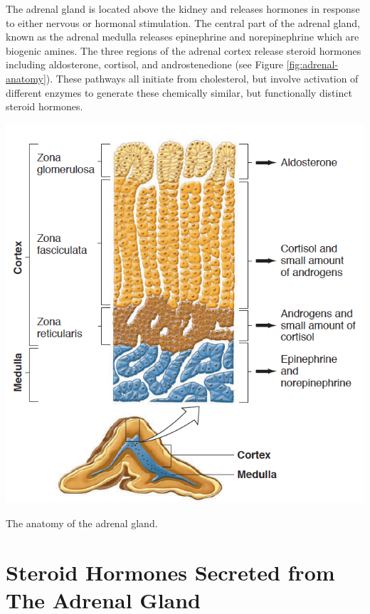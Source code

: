 \documentclass{tufte-handout}
\begin{document}
The adrenal gland is located above the kidney and releases hormones in response to either nervous or hormonal stimulation.  The central part of the adrenal gland, known as the adrenal medulla releases epinephrine and norepinephrine which are biogenic amines.  The three regions of the adrenal cortex release steroid hormones including aldosterone, cortisol, and androstenedione (see Figure \ref{fig:adrenal-anatomy}).  These pathways all initiate from cholesterol, but involve activation of different enzymes to generate these chemically similar, but functionally distinct steroid hormones.

\begin{marginfigure}
  \includegraphics{figures/adrenal-anatomy}
  \caption{The anatomy of the adrenal gland.}
    \label{fig:adrenal-anatomy}
\end{marginfigure}

\section{Steroid Hormones Secreted from The Adrenal Gland}
\end{document}
